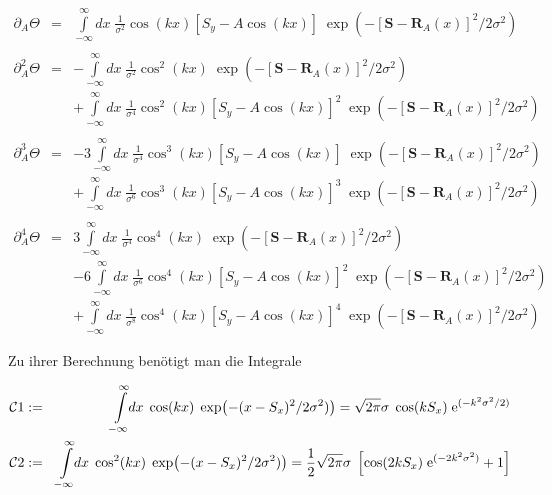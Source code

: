 \begin{small}
    \begin{eqnarray*}
    {\partial_A}
        \Theta &=&\int\limits_{-\infty}^{\infty}\!\!\!dx\; \frac{1}{\sigma^2} \cos(kx)\left[S_y-A\cos(kx)\right] \;\exp\!\left(-[\mathbf{S}-\mathbf{R}_A(x)]^2/2\sigma^2\right)\\
        &&\\
        {\partial^2_A}  \Theta &=& -\int\limits_{-\infty}^{\infty}\!\!\!dx\; \frac{1}{\sigma^2} \cos^2(kx) \;\exp\!\left(-[\mathbf{S}-\mathbf{R}_A(x)]^2/2\sigma^2\right) \\
        &&+ \int\limits_{-\infty}^{\infty}\!\!\!dx\; \frac{1}{\sigma^4} \cos^2(kx)\left[S_y-A\cos(kx)\right]^2  \;\exp\!\left(-[\mathbf{S}-\mathbf{R}_A(x)]^2/2\sigma^2\right)\\
        &&\\
        {\partial^3_A}  \Theta &=& -3 \int\limits_{-\infty}^{\infty}\!\!\!dx\; \frac{1}{\sigma^4} \cos^3(kx) \left[S_y-A\cos(kx)\right] \;\exp\!\left(-[\mathbf{S}-\mathbf{R}_A(x)]^2/2\sigma^2\right) \\
        &&+ \int\limits_{-\infty}^{\infty}\!\!\!dx\; \frac{1}{\sigma^6} \cos^3(kx) \left[S_y-A\cos(kx)\right]^3 \;\exp\!\left(-[\mathbf{S}-\mathbf{R}_A(x)]^2/2\sigma^2\right)\\
        &&\\
        {\partial^4_A}  \Theta &=& 3 \int\limits_{-\infty}^{\infty}\!\!\!dx\; \frac{1}{\sigma^4} \cos^4(kx) \;\exp\!\left(-[\mathbf{S}-\mathbf{R}_A(x)]^2/2\sigma^2\right) \\
        &&- 6 \int\limits_{-\infty}^{\infty}\!\!\!dx\; \frac{1}{\sigma^6} \cos^4(kx) \left[S_y-A\cos(kx)\right]^2 \;\exp\!\left(-[\mathbf{S}-\mathbf{R}_A(x)]^2/2\sigma^2\right) \\
        &&+\int\limits_{-\infty}^{\infty}\!\!\!dx\; \frac{1}{\sigma^8} \cos^4(kx) \left[S_y-A\cos(kx)\right]^4 \;\exp\!\left(-[\mathbf{S}-\mathbf{R}_A(x)]^2/2\sigma^2\right)
    \end{eqnarray*}
\end{small}

\noindent Zu ihrer Berechnung benötigt man die Integrale

\begin{small}
    \begin{eqnarray*}
    {\cal C}
        1 &:=&\;\;\int\limits_{-\infty}^{\infty}\!\!dx\;\cos(kx)\;\exp\!\left(-(x-S_x)^2/2\sigma^2)\right)=\sqrt{2\pi}\sigma\;\cos(kS_x)\;{\rm e}^{(-k^2\sigma^2/2)}\\
        {\cal C}2 &:=&\int\limits_{-\infty}^{\infty}\!\!dx\;\cos^2(kx)\;\exp\!\left(-(x-S_x)^2/2\sigma^2)\right)=\frac{1}{2}\sqrt{2\pi}\sigma\;\left[\cos(2kS_x)\;{\rm e}^{(-2k^2\sigma^2)}+1\right]
    \end{eqnarray*}
\end{small}

